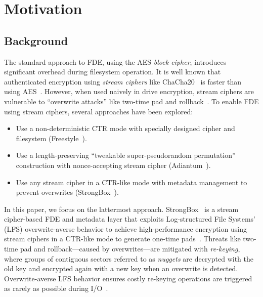 \section{Motivation}\label{sec:motivation}

\subsection{Background}


The standard approach to FDE, using the AES \emph{block cipher}, introduces
significant overhead during filesystem operation. It is well known that
authenticated encryption using \emph{stream ciphers} like
ChaCha20~\cite{ChaCha20} is faster than using AES~\cite{StrongBox, AnotherPaper,
AnotherPaper}. However, when used naively in drive encryption, stream ciphers
are vulnerable to ``overwrite attacks'' like two-time pad and
rollback~\cite{StrongBox}. To enable FDE using stream ciphers, several
approaches have been explored:

\begin{itemize}
   \item Use a non-deterministic CTR mode with specially designed cipher and
   filesystem (Freestyle~\cite{Freestyle}).
   \item Use a length-preserving ``tweakable super-pseudorandom permutation''
   construction with nonce-accepting stream cipher (Adiantum~\cite{Adiantum}).
   \item Use any stream cipher in a CTR-like mode with metadata management to
   prevent overwrites (StrongBox~\cite{StrongBox}).
\end{itemize}

In this paper, we focus on the lattermost approach. StrongBox~\cite{StrongBox}
is a stream cipher-based FDE and metadata layer that exploits Log-structured
File Systems' (LFS) overwrite-averse behavior to achieve high-performance
encryption using stream ciphers in a CTR-like mode to generate one-time
pads~\cite{OTP}. Threats like two-time pad and rollback---caused by
overwrites---are mitigated with \emph{re-keying}, where groups of contiguous
sectors referred to as \emph{nuggets} are decrypted with the old key and
encrypted again with a new key when an overwrite is detected. Overwrite-averse
LFS behavior ensures costly re-keying operations are triggered as rarely as
possible during I/O~\cite{StrongBox}.

